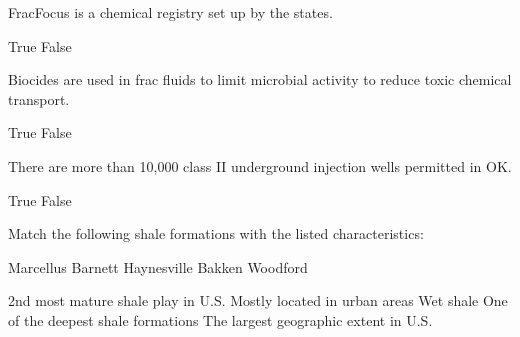 \begin{naquestion}[individual=true]
\label{qid.GEOG_Unit4_quiz.08}
FracFocus is a chemical registry set up by the states.
\begin{naqmultiplechoicepart}
\begin{naqchoices}
    \naqchoice True 
    \naqchoice[1] False
\end{naqchoices}
\end{naqmultiplechoicepart}
\end{naquestion}

\begin{naquestion}[individual=true]
\label{qid.GEOG_Unit4_quiz.09}
Biocides are used in frac fluids to limit microbial activity to reduce toxic chemical transport.
\begin{naqmultiplechoicepart}
\begin{naqchoices}
    \naqchoice True 
    \naqchoice[1] False
\end{naqchoices}
\end{naqmultiplechoicepart}
\end{naquestion}

\begin{naquestion}[individual=true]
\label{qid.GEOG_Unit4_quiz.10}
There are more than 10,000 class II underground injection wells permitted in OK.
\begin{naqmultiplechoicepart}
\begin{naqchoices}
    \naqchoice[1] True 
    \naqchoice False
\end{naqchoices}
\end{naqmultiplechoicepart}
\end{naquestion}

\begin{naquestion}[individual=true]
\label{qid.GEOG_Unit4_quiz.11}
Match the following shale formations with the listed characteristics:
\begin{naqorderingpart}
   \begin{naqmlabels}
        \naqmlabel[4] Marcellus
        \naqmlabel[1] Barnett
        \naqmlabel[3] Haynesville
        \naqmlabel[2] Bakken
        \naqmlabel[0] Woodford
    \end{naqmlabels}
    \begin{naqmvalues}
        \naqmvalue 2nd most mature shale play in U.S.
        \naqmvalue Mostly located in urban areas
        \naqmvalue Wet shale
        \naqmvalue One of the deepest shale formations
        \naqmvalue The largest geographic extent in U.S.
    \end{naqmvalues}
\end{naqorderingpart}
\end{naquestion}

